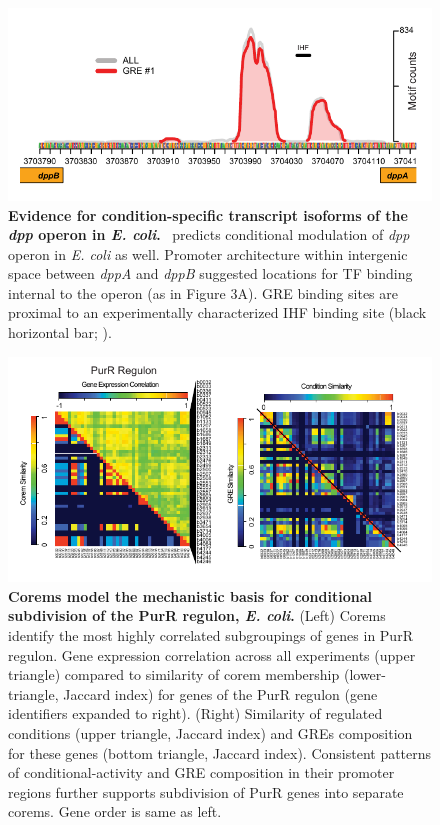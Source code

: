 \begin{figure}[h!]
\centering
\includegraphics[width=0.6\linewidth]{figures/dpp_ecoli.pdf}
\caption[Evidence for condition-specific transcript isoforms of the \textit{dpp} operon in \textit{E. coli}]{\textbf{Evidence for condition-specific transcript isoforms of the \textit{dpp} operon in \textit{E. coli}.} \egrine~predicts conditional modulation of \textit{dpp} operon in {\it E. coli} as well. Promoter architecture within intergenic space between \textit{dppA} and \textit{dppB} suggested locations for TF binding internal to the operon (as in Figure 3A). GRE binding sites are proximal to an experimentally characterized IHF binding site (black horizontal bar; \rdb).}
\label{fig:dpp_ecoli}
\end{figure}

\begin{figure}[h!]
\centering
\includegraphics[width=0.95\linewidth]{figures/purR_heatmap.pdf}
\caption[Corems model the mechanistic basis for conditional subdivision of the PurR regulon, \textit{E. coli}]{\textbf{Corems model the mechanistic basis for conditional subdivision of the PurR regulon, \textit{E. coli}.} (Left) Corems identify the most highly correlated subgroupings of genes in PurR regulon. Gene expression correlation across all experiments (upper triangle) compared to similarity of corem membership (lower-triangle, Jaccard index) for genes of the PurR regulon (gene identifiers expanded to right). (Right) Similarity of regulated conditions (upper triangle, Jaccard index) and GREs composition for these genes (bottom triangle, Jaccard index). Consistent patterns of conditional-activity and GRE composition in their promoter regions further supports subdivision of PurR genes into separate corems. Gene order is same as left.}
\label{fig:purR_heatmap}
\end{figure}

